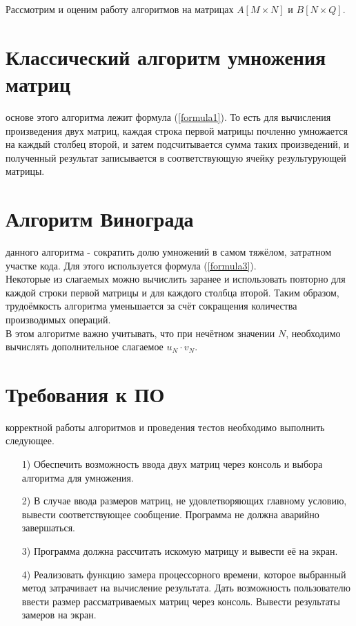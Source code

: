 Рассмотрим и оценим работу алгоритмов на матрицах $A[M \times N]$ и $B[N \times Q]$. 

\section{Классический алгоритм умножения матриц}
 основе этого алгоритма лежит формула (\ref{formula1}). То есть для вычисления произведения двух матриц, каждая строка первой матрицы почленно умножается на каждый столбец второй, и затем подсчитывается сумма таких произведений, и полученный результат записывается в соответствующую ячейку результурующей матрицы.

\section{Алгоритм Винограда}
 данного алгоритма - сократить долю умножений в самом тяжёлом, затратном участке кода. Для этого используется формула (\ref{formula3}).\\

Некоторые из слагаемых можно вычислить заранее и использовать повторно для каждой строки первой матрицы и для каждого столбца второй. Таким образом, трудоёмкость алгоритма уменьшается за счёт сокращения количества производимых операций.\\

В этом алгоритме важно учитывать, что при нечётном значении $N$, необходимо вычислять дополнительное слагаемое $u_N \cdot v_N$.

\section{Требования к ПО}
 корректной работы алгоритмов и проведения тестов необходимо выполнить следующее.
\begin{enumerate}
	\item[1)]Обеспечить возможность ввода двух матриц через консоль и выбора алгоритма для умножения.
	\item[2)]В случае ввода размеров матриц, не удовлетворяющих главному условию, вывести соответствующее сообщение. Программа не должна аварийно завершаться.
	\item[3)]Программа должна рассчитать искомую матрицу и вывести её на экран.
	\item[4)]Реализовать функцию замера процессорного времени, которое выбранный метод затрачивает на вычисление результата. Дать возможность пользователю ввести размер рассматриваемых матриц через консоль. Вывести результаты замеров на экран.
\end{enumerate}


